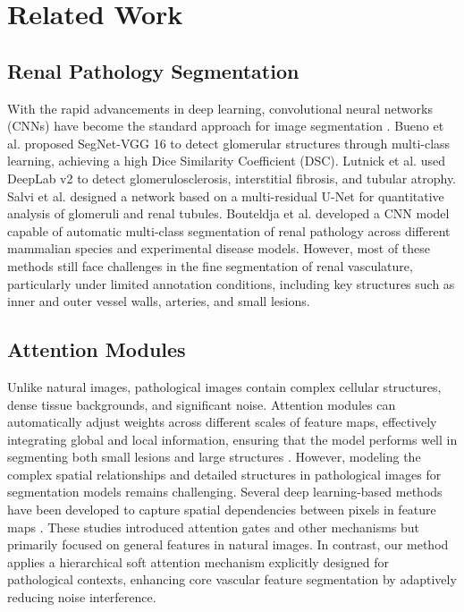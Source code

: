 \section{Related Work}
\subsection{Renal Pathology Segmentation}
\label{sec:title}
With the rapid advancements in deep learning, convolutional neural networks (CNNs) have become the standard approach for image segmentation \cite{feng2023artificial,hara2022evaluating}. Bueno et al. \cite{bueno2020glomerulosclerosis} proposed SegNet-VGG 16 to detect glomerular structures through multi-class learning, achieving a high Dice Similarity Coefficient (DSC). Lutnick et al. \cite{lutnick2019integrated} used DeepLab v2 to detect glomerulosclerosis, interstitial fibrosis, and tubular atrophy. Salvi et al. \cite{salvi2021automated} designed a network based on a multi-residual U-Net for quantitative analysis of glomeruli and renal tubules. Bouteldja et al. \cite{bouteldja2021deep} developed a CNN model capable of automatic multi-class segmentation of renal pathology across different mammalian species and experimental disease models. However, most of these methods still face challenges in the fine segmentation of renal vasculature, particularly under limited annotation conditions, including key structures such as inner and outer vessel walls, arteries, and small lesions.

\subsection{Attention Modules}
\label{sec:title}
Unlike natural images, pathological images contain complex cellular structures, dense tissue backgrounds, and significant noise. Attention modules can automatically adjust weights across different scales of feature maps, effectively integrating global and local information, ensuring that the model performs well in segmenting both small lesions and large structures \cite{azad2022smu}. However, modeling the complex spatial relationships and detailed structures in pathological images for segmentation models remains challenging. Several deep learning-based methods have been developed to capture spatial dependencies between pixels in feature maps \cite{fan2020ma,guo2021sa,azad2021deep}. These studies introduced attention gates and other mechanisms but primarily focused on general features in natural images. In contrast, our method applies a hierarchical soft attention mechanism explicitly designed for pathological contexts, enhancing core vascular feature segmentation by adaptively reducing noise interference.

